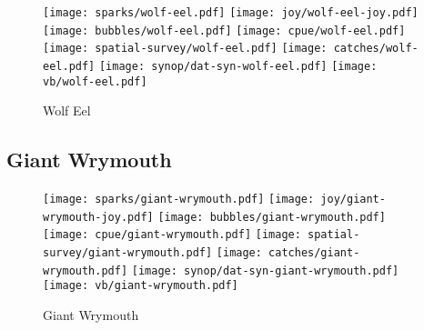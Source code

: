 \begin{figure}[htbp]
\centering
\texttt{[image: sparks/wolf-eel.pdf]}
\texttt{[image: joy/wolf-eel-joy.pdf]}
\texttt{[image: bubbles/wolf-eel.pdf]}
\texttt{[image: cpue/wolf-eel.pdf]}
\texttt{[image: spatial-survey/wolf-eel.pdf]}
\texttt{[image: catches/wolf-eel.pdf]}
\texttt{[image: synop/dat-syn-wolf-eel.pdf]}
\texttt{[image: vb/wolf-eel.pdf]}
\caption{Wolf Eel}
\end{figure}
\clearpage
\subsection*{Giant Wrymouth}

\begin{figure}[htbp]
\centering
\texttt{[image: sparks/giant-wrymouth.pdf]}
\texttt{[image: joy/giant-wrymouth-joy.pdf]}
\texttt{[image: bubbles/giant-wrymouth.pdf]}
\texttt{[image: cpue/giant-wrymouth.pdf]}
\texttt{[image: spatial-survey/giant-wrymouth.pdf]}
\texttt{[image: catches/giant-wrymouth.pdf]}
\texttt{[image: synop/dat-syn-giant-wrymouth.pdf]}
\texttt{[image: vb/giant-wrymouth.pdf]}
\caption{Giant Wrymouth}
\end{figure}
\clearpage
